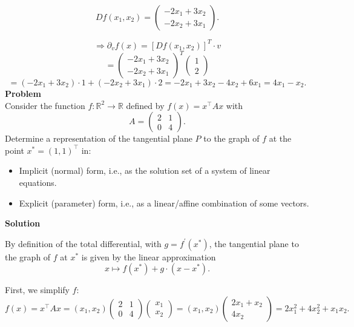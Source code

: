 \documentclass{article}
\begin{document}
\[
Df(x_1, x_2) = 
\begin{pmatrix}
-2x_1 + 3x_2 \\
-2x_2 + 3x_1
\end{pmatrix}.
\]

\[
\Rightarrow \partial_v f(x) = [Df(x_1, x_2)]^T \cdot v
\]
\[
= 
\begin{pmatrix}
-2x_1 + 3x_2 \\
-2x_2 + 3x_1
\end{pmatrix}^T 
\begin{pmatrix}
1 \\
2
\end{pmatrix}
\]
\[
= (-2x_1 + 3x_2) \cdot 1 + (-2x_2 + 3x_1) \cdot 2 = -2x_1 + 3x_2 - 4x_2 + 6x_1 = 4x_1 - x_2.
\]
\newpage
\textbf{Problem}\\
Consider the function \( f: \mathbb{R}^{2} \to \mathbb{R} \) defined by \( f(x) = x^{\top}Ax \) with
\[
A = \begin{pmatrix} 2 & 1 \\ 0 & 4 \end{pmatrix}.
\]
Determine a representation of the tangential plane \( P \) to the graph of \( f \) at the point \( x^{*} = (1,1)^{\top} \) in:
\begin{itemize}
    \item Implicit (normal) form, i.e., as the solution set of a system of linear equations.
    \item Explicit (parameter) form, i.e., as a linear/affine combination of some vectors.
\end{itemize}

\textbf{Solution}

By definition of the total differential, with \( g = f^{\prime}(x^{*}) \), the tangential plane to the graph of \( f \) at \( x^{*} \) is given by the linear approximation
\[
x \mapsto f(x^{*}) + g \cdot (x - x^{*}).
\]

First, we simplify \( f \):
\[
f(x) = x^{\top}Ax = (x_{1}, x_{2}) \begin{pmatrix} 2 & 1 \\ 0 & 4 \end{pmatrix} \begin{pmatrix} x_{1} \\ x_{2} \end{pmatrix} = (x_{1}, x_{2}) \begin{pmatrix} 2x_{1} + x_{2} \\ 4x_{2} \end{pmatrix} = 2x_{1}^{2} + 4x_{2}^{2} + x_{1}x_{2}.
\]
\end{document}
